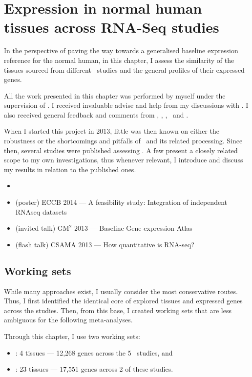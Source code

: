 \chapter{Expression in normal human tissues across RNA-Seq studies}
\label{ch:Transcriptomics}

In the perspective of paving the way towards
a generalised baseline expression reference for the normal human,
in this chapter, I assess the similarity
of the tissues sourced from different \Rnaseq\ studies and
the general profiles of their expressed genes.

All the work presented in this chapter was performed by myself under the
supervision of \alvis.
I received invaluable advise and help from my discussions with \nuno.
I also received general feedback and comments from \mar, \johan, \sarah, \gos\
and \wolfgang.

When I started this project in 2013,
little was then known on either the robustness or
the shortcomings and pitfalls of \Rnaseq\ and
its related processing.
Since then, several studies were published assessing \Rnaseq.
A few present a closely related scope to my own investigations, thus
whenever relevant,
I introduce and discuss my results in relation to the published ones.

\derivativeWork{}
\begin{itemize}[topsep=0pt,nosep]
    \item {}
    \item (poster) ECCB 2014 --- A feasibility study:
        Integration of independent RNAseq datasets
    \item (invited talk) GM$^2$ 2013 --- Baseline Gene expression Atlas
    \item (flash talk) CSAMA 2013 --- How quantitative is RNA-seq?
\end{itemize}
\clearpage

\section{Working sets}

While many approaches exist,
I usually consider the most conservative routes.
Thus, I first identified the identical core of
explored tissues and expressed genes across the studies.
Then, from this base, I created working sets
that are less ambiguous for the following meta-analyses.

Through this chapter, I use two working sets:
\begin{itemize}[topsep=0pt,nosep]
    \item \setOne: 4 tissues --- 12,268 genes across the 5 \Rnaseq\ studies, and
    \item \setTwo: 23 tissues --- 17,551 genes across 2 of these studies.
\end{itemize}

